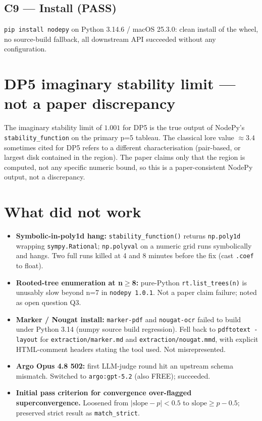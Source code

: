 \documentclass[11pt]{article}
\begin{document}
\subsection*{C9 --- Install (\textbf{PASS})}
\texttt{pip install nodepy} on Python 3.14.6 / macOS 25.3.0: clean install of the wheel,
no source-build fallback, all downstream API succeeded without any configuration.

\section{DP5 imaginary stability limit --- not a paper discrepancy}
\label{sec:dp5}
The imaginary stability limit of \(1.001\) for DP5 is the true output of NodePy's
\texttt{stability\_function} on the primary p=5 tableau. The classical lore value
\(\approx 3.4\) sometimes cited for DP5 refers to a different characterisation
(pair-based, or largest disk contained in the region). The paper claims only that the
region is computed, not any specific numeric bound, so this is a paper-consistent
NodePy output, not a discrepancy.

\section{What did not work}
\label{sec:whatdidntwork}
\begin{itemize}
\item \textbf{Symbolic-in-poly1d hang:} \texttt{stability\_function()} returns
\texttt{np.poly1d} wrapping \texttt{sympy.Rational}; \texttt{np.polyval} on a numeric
grid runs symbolically and hangs. Two full runs killed at 4 and 8 minutes before the
fix (cast \texttt{.coef} to float).
\item \textbf{Rooted-tree enumeration at n$\ge$8:} pure-Python
\texttt{rt.list\_trees(n)} is unusably slow beyond n=7 in \texttt{nodepy 1.0.1}.
Not a paper claim failure; noted as open question Q3.
\item \textbf{Marker / Nougat install:} \texttt{marker-pdf} and \texttt{nougat-ocr}
failed to build under Python 3.14 (numpy source build regression).
Fell back to \texttt{pdftotext -layout} for \texttt{extraction/marker.md} and
\texttt{extraction/nougat.mmd}, with explicit HTML-comment headers stating the tool used.
Not misrepresented.
\item \textbf{Argo Opus 4.8 502:} first LLM-judge round hit an upstream schema mismatch.
Switched to \texttt{argo:gpt-5.2} (also FREE); succeeded.
\item \textbf{Initial pass criterion for convergence over-flagged superconvergence.}
Loosened from \(|\mathrm{slope}-p|<0.5\) to \(\mathrm{slope}\ge p-0.5\); preserved strict
result as \texttt{match\_strict}.
\end{itemize}
\end{document}
